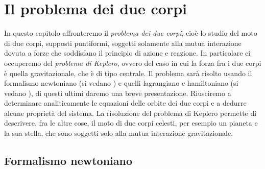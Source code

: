 \chapter{Il problema dei due corpi}
\label{chap:due-corpi}

In questo capitolo affronteremo il \emph{problema dei due corpi}, cioè lo studio
del moto di due corpi, supposti puntiformi, soggetti solamente alla mutua
interazione dovuta a forze che soddisfano il principio di azione e reazione. In
particolare ci occuperemo del \emph{problema di Keplero}, ovvero del caso in cui
la forza fra i due corpi è quella gravitazionale, che è di tipo centrale. Il
problema sarà risolto usando il formalismo newtoniano (si vedano
\textcites{bradt:processes}{fabrizio:meccanica}{smart:textbook}) e quelli
lagrangiano e hamiltoniano (si vedano
\textcites{goldstein:meccanica}{landau:meccanica}), di questi ultimi daremo una
breve presentazione. Riusciremo a determinare analiticamente le equazioni delle
orbite dei due corpi e a dedurre alcune proprietà del sistema. La risoluzione
del problema di Keplero permette di descrivere, fra le altre cose, il moto di
due corpi celesti, per esempio un pianeta e la sua stella, che sono soggetti
solo alla mutua interazione gravitazionale.

\section{Formalismo newtoniano}
\label{sec:formalismo-newton}

